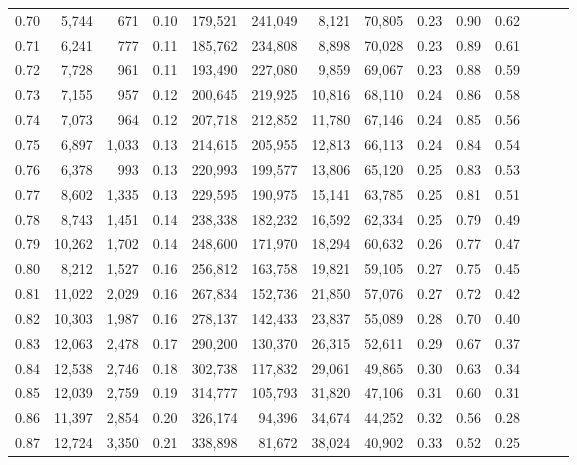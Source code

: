 \begin{tabular}{rrrrrrrrrrrrrr}
0.70 &   5,744 &    671 &  0.10 &  179,521 &  241,049 &   8,121 &  70,805 &  0.23 &  0.90 &      0.62 \\
0.71 &   6,241 &    777 &  0.11 &  185,762 &  234,808 &   8,898 &  70,028 &  0.23 &  0.89 &      0.61 \\
0.72 &   7,728 &    961 &  0.11 &  193,490 &  227,080 &   9,859 &  69,067 &  0.23 &  0.88 &      0.59 \\
0.73 &   7,155 &    957 &  0.12 &  200,645 &  219,925 &  10,816 &  68,110 &  0.24 &  0.86 &      0.58 \\
0.74 &   7,073 &    964 &  0.12 &  207,718 &  212,852 &  11,780 &  67,146 &  0.24 &  0.85 &      0.56 \\
0.75 &   6,897 &  1,033 &  0.13 &  214,615 &  205,955 &  12,813 &  66,113 &  0.24 &  0.84 &      0.54 \\
0.76 &   6,378 &    993 &  0.13 &  220,993 &  199,577 &  13,806 &  65,120 &  0.25 &  0.83 &      0.53 \\
0.77 &   8,602 &  1,335 &  0.13 &  229,595 &  190,975 &  15,141 &  63,785 &  0.25 &  0.81 &      0.51 \\
0.78 &   8,743 &  1,451 &  0.14 &  238,338 &  182,232 &  16,592 &  62,334 &  0.25 &  0.79 &      0.49 \\
0.79 &  10,262 &  1,702 &  0.14 &  248,600 &  171,970 &  18,294 &  60,632 &  0.26 &  0.77 &      0.47 \\
0.80 &   8,212 &  1,527 &  0.16 &  256,812 &  163,758 &  19,821 &  59,105 &  0.27 &  0.75 &      0.45 \\
0.81 &  11,022 &  2,029 &  0.16 &  267,834 &  152,736 &  21,850 &  57,076 &  0.27 &  0.72 &      0.42 \\
0.82 &  10,303 &  1,987 &  0.16 &  278,137 &  142,433 &  23,837 &  55,089 &  0.28 &  0.70 &      0.40 \\
0.83 &  12,063 &  2,478 &  0.17 &  290,200 &  130,370 &  26,315 &  52,611 &  0.29 &  0.67 &      0.37 \\
0.84 &  12,538 &  2,746 &  0.18 &  302,738 &  117,832 &  29,061 &  49,865 &  0.30 &  0.63 &      0.34 \\
0.85 &  12,039 &  2,759 &  0.19 &  314,777 &  105,793 &  31,820 &  47,106 &  0.31 &  0.60 &      0.31 \\
0.86 &  11,397 &  2,854 &  0.20 &  326,174 &   94,396 &  34,674 &  44,252 &  0.32 &  0.56 &      0.28 \\
0.87 &  12,724 &  3,350 &  0.21 &  338,898 &   81,672 &  38,024 &  40,902 &  0.33 &  0.52 &      0.25 \\

\end{tabular}
